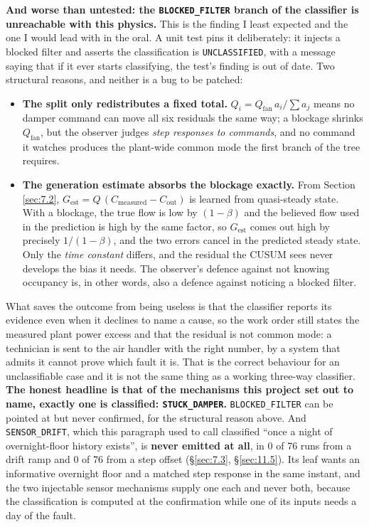 \textbf{And worse than untested: the \texttt{BLOCKED\_FILTER} branch of the classifier is
unreachable with this physics.} This is the finding I least expected and the one I would lead with
in the oral. A unit test pins it deliberately: it injects a blocked filter and asserts the
classification is \texttt{UNCLASSIFIED}, with a message saying that if it ever starts classifying,
the test's finding is out of date. Two structural reasons, and neither is a bug to be patched:

\begin{itemize}
\tightlist
\item \textbf{The split only redistributes a fixed total.} $Q_i = Q_\text{fan}\,a_i/\sum a_j$ means
  no damper command can move all six residuals the same way; a blockage shrinks $Q_\text{fan}$, but
  the observer judges \emph{step responses to commands}, and no command it watches produces the
  plant-wide common mode the first branch of the tree requires.
\item \textbf{The generation estimate absorbs the blockage exactly.} From Section \ref{sec:7.2},
  $G_\text{est} = Q\,(C_\text{measured} - C_\text{out})$ is learned from quasi-steady state. With a
  blockage, the true flow is low by $(1-\beta)$ and the believed flow used in the prediction is high
  by the same factor, so $G_\text{est}$ comes out high by precisely $1/(1-\beta)$, and the two
  errors cancel in the predicted steady state. Only the \emph{time constant} differs, and the
  residual the CUSUM sees never develops the bias it needs. The observer's defence against not
  knowing occupancy is, in other words, also a defence against noticing a blocked filter.
\end{itemize}

What saves the outcome from being useless is that the classifier reports its evidence even when it
declines to name a cause, so the work order still states the measured plant power excess and that the
residual is not common mode: a technician is sent to the air handler with the right number, by a
system that admits it cannot prove which fault it is. That is the correct behaviour for an
unclassifiable case and it is not the same thing as a working three-way classifier. \textbf{The
honest headline is that of the mechanisms this project set out to name, exactly one is classified:
\texttt{STUCK\_DAMPER}.} \texttt{BLOCKED\_FILTER} can be pointed at but never confirmed, for the
structural reason above. And \texttt{SENSOR\_DRIFT}, which this paragraph used to call classified
``once a night of overnight-floor history exists'', is \textbf{never emitted at all}, in 0 of 76
runs from a drift ramp and 0 of 76 from a step offset (§\ref{sec:7.3}, §\ref{sec:11.5}). Its leaf wants an informative
overnight floor and a matched step response in the same instant, and the two injectable sensor
mechanisms supply one each and never both, because the classification is computed at the confirmation
while one of its inputs needs a day of the fault.


